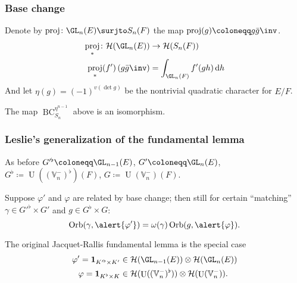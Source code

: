 \documentclass[11pt]{beamer}
\DeclareMathOperator{\BC}{BC}
\DeclareMathOperator{\Orb}{Orb}
\DeclareMathOperator{\Sat}{Satake}
\DeclareMathOperator{\U}{U}
\DeclareMathOperator{\rproj}{proj}
\newcommand{\HH}{\mathcal{H}}
\newcommand{\VV}{\mathbb{V}}
\begin{document}
\begin{frame}[fragile]
  \frametitle{Base change}
  Denote by $\rproj \colon \GL_n(E) \surjto S_n(F)$ the map $\rproj(g) \coloneqq g \bar{g}\inv$.
  \begin{align*}
    \rproj_\ast \colon \HH(\GL_n(E)) &\to \HH(S_n(F)) \\
    \rproj_\ast(f')\left( g\bar{g}\inv \right) &= \int_{\GL_n(F)} f'(gh) \odif h
  \end{align*}
  And let $\eta(g) = (-1)^{v(\det g)}$ be the nontrivial quadratic character for $E/F$.
  \begin{center}
  \end{center}
  \begin{theorem}
    [Leslie 2023]
    The map $\BC_{S_n}^{\eta^{n-1}}$ above is an isomorphism.
  \end{theorem}
\end{frame}


\begin{frame}
  \frametitle{Leslie's generalization of the fundamental lemma}
  As before $G'^\flat \coloneqq \GL_{n-1}(E)$, $G' \coloneqq \GL_n(E)$,
  $G^\flat \coloneqq \U((\VV_n^-)^\flat)(F)$, $G \coloneqq \U(\VV_n^-)(F)$.

  \begin{theorem}[Leslie 2023]
    Suppose \alert{$\varphi'$ and $\varphi$ are related by base change}; then still
    for certain ``matching'' $\gamma \in G'^\flat \times G'$ and $g \in G^\flat \times G$:
    \[ \Orb(\gamma, \alert{\varphi'}) = \omega(\gamma) \Orb(g, \alert{\varphi}). \]
  \end{theorem}

  The original Jacquet-Rallis fundamental lemma is the special case
  \begin{align*}
    \varphi' = \mathbf{1}_{K'^\flat \times K'} &\in \HH(\GL_{n-1}(E)) \otimes \HH(\GL_n(E)) \\
    \varphi = \mathbf{1}_{K^\flat \times K} &\in \HH(\U((\VV_n^-)^\flat)) \otimes \HH(\U(\VV_n^-)).
  \end{align*}
\end{frame}
\end{document}
